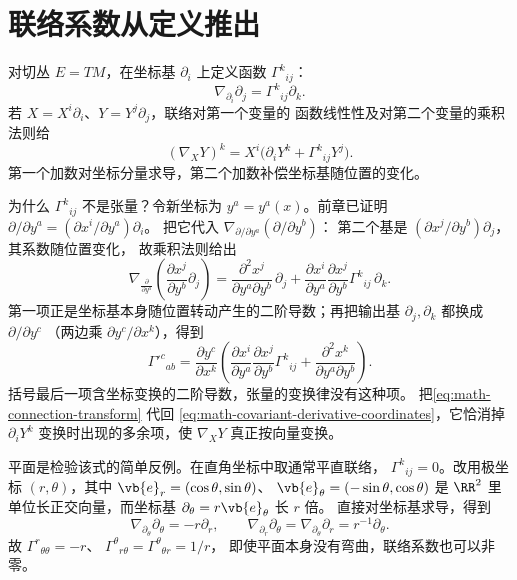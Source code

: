 \section{联络系数从定义推出}
\label{sec:math-connection-coefficients}

对切丛 \(E=TM\)，在坐标基 \(\partial_i\) 上定义函数
\(\Gamma^k{}_{ij}\)：
\[
\nabla_{\partial_i}\partial_j=\Gamma^k{}_{ij}\partial_k.
\]
若 \(X=X^i\partial_i\)、\(Y=Y^j\partial_j\)，联络对第一个变量的
函数线性性及对第二个变量的乘积法则给
\begin{equation}
(\nabla_XY)^k
=X^i\bigl(\partial_iY^k+\Gamma^k{}_{ij}Y^j\bigr).
\label{eq:math-covariant-derivative-coordinates}
\end{equation}
第一个加数对坐标分量求导，第二个加数补偿坐标基随位置的变化。

为什么 \(\Gamma^k{}_{ij}\) 不是张量？令新坐标为
\(y^a=y^a(x)\)。前章已证明
\(\partial/\partial y^a=(\partial x^i/\partial y^a)\partial_i\)。
把它代入 \(\nabla_{\partial/\partial y^a}(\partial/\partial y^b)\)：
第二个基是 \((\partial x^j/\partial y^b)\partial_j\)，其系数随位置变化，
故乘积法则给出
\[
\nabla_{\frac{\partial}{\partial y^a}}
\left(\frac{\partial x^j}{\partial y^b}\partial_j\right)
=
\frac{\partial^2 x^j}{\partial y^a\partial y^b}\,\partial_j
+
\frac{\partial x^i}{\partial y^a}\frac{\partial x^j}{\partial y^b}
\Gamma^k{}_{ij}\,\partial_k .
\]
第一项正是坐标基本身随位置转动产生的二阶导数；再把输出基
\(\partial_j,\partial_k\) 都换成 \(\partial/\partial y^c\)
（两边乘 \(\partial y^c/\partial x^k\)），得到
\begin{equation}
\Gamma'^c{}_{ab}
=\frac{\partial y^c}{\partial x^k}
\left(
\frac{\partial x^i}{\partial y^a}
\frac{\partial x^j}{\partial y^b}\Gamma^k{}_{ij}
+\frac{\partial^2x^k}{\partial y^a\partial y^b}
\right).
\label{eq:math-connection-transform}
\end{equation}
括号最后一项含坐标变换的二阶导数，张量的变换律没有这种项。
把\cref{eq:math-connection-transform} 代回
\cref{eq:math-covariant-derivative-coordinates}，它恰消掉
\(\partial_iY^k\) 变换时出现的多余项，使 \(\nabla_XY\) 真正按向量变换。

平面是检验该式的简单反例。在直角坐标中取通常平直联络，
\(\Gamma^k{}_{ij}=0\)。改用极坐标 \((r,\theta)\)，其中
\(\vb{e}_r=(\cos\theta,\sin\theta)\)、
\(\vb{e}_\theta=(-\sin\theta,\cos\theta)\) 是 \(\RR^2\) 里
单位长正交向量，而坐标基 \(\partial_\theta=r\vb{e}_\theta\) 长 \(r\) 倍。
直接对坐标基求导，得到
\[
\nabla_{\partial_\theta}\partial_\theta=-r\partial_r,\qquad
\nabla_{\partial_r}\partial_\theta
=\nabla_{\partial_\theta}\partial_r=r^{-1}\partial_\theta.
\]
故 \(\Gamma^r{}_{\theta\theta}=-r\)、
\(\Gamma^\theta{}_{r\theta}=\Gamma^\theta{}_{\theta r}=1/r\)，
即使平面本身没有弯曲，联络系数也可以非零。

